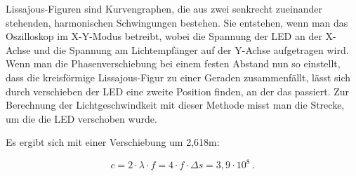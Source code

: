 Lissajous-Figuren sind Kurvengraphen, die aus zwei senkrecht zueinander stehenden, harmonischen Schwingungen bestehen. Sie entstehen, wenn man das Oszilloskop im X-Y-Modus betreibt, wobei die Spannung der LED an der X-Achse und die Spannung am Lichtempfänger auf der Y-Achse aufgetragen wird. Wenn man die Phasenverschiebung bei einem festen Abstand nun so einstellt, dass die kreisförmige Lissajous-Figur zu einer Geraden zusammenfällt, lässt sich durch verschieben der LED eine zweite Position finden, an der das passiert.
Zur Berechnung der Lichtgeschwindkeit mit dieser Methode misst man die Strecke, um die die LED verschoben wurde.

Es ergibt sich mit einer Verschiebung um 2,618m:

\begin{equation}
    c = 2 \cdot \lambda  \cdot f = 4 \cdot f \cdot \Delta s = 3,9 \cdot 10^8\,.
\end{equation}